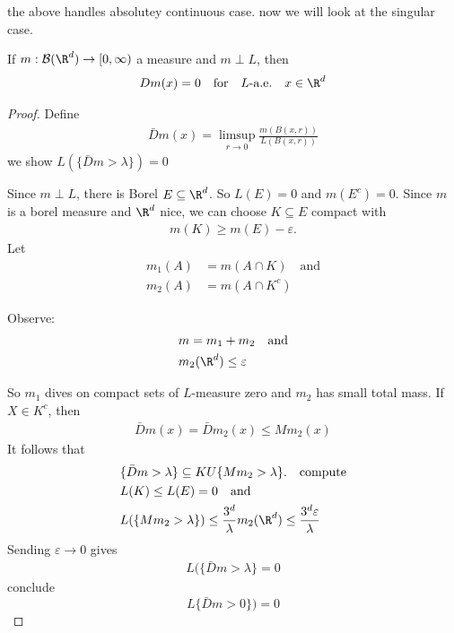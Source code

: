 \begin{remark}
	the above handles absolutey continuous case. now we will  look at the singular case.
\end{remark}


\begin{theorem}
	If $m : \mathcal{B}(\R^d) \to [0,\infty)$ a measure and $m \perp L$, then
	\begin{align*}
		D m(x) = 0 \quad \text{for} \quad L \text{-a.e.} \quad x \in \R^d
	\end{align*} 
\end{theorem}

\begin{proof}
	Define 
	\begin{align*}
		\bar{D} m(x) = \limsup_{r \to 0} \frac{m(B(x,r))}{L(B(x,r))}
	\end{align*} 
we show $L( \{ \bar{D}m > \lambda \}) = 0$

Since $m \perp L$, there is Borel $E \subseteq \R^d$. So $L(E) = 0$ and $m(E^c) = 0$.
Since  $m$ is a borel measure and $\R^d$ nice, we can choose $K \subseteq  E$ compact with
\begin{align*}
	m(K) \geq m(E) - \varepsilon.
\end{align*} 
Let
\begin{align*}
	m_1 (A) &= m(A \cap K) \quad \text{and} \\
	m_2 (A)	&= m( A \cap K^c)
\end{align*}

Observe: 
\begin{align*}
	&m = m_1 + m_2 \quad \text{and} \\
	&m_2(\R^d)\leq \varepsilon
\end{align*} 

So $m_1$ dives on compact sets of $L$-measure zero and $m_2$ has small total mass.
If $X \in K^c$, then 
\begin{align*}
	\bar{D}m(x) = \bar D m_2 (x) \leq M m_2 (x)
\end{align*} 
It follows that 
\begin{align*}
	&\{ \bar{D} m > \lambda \} \subseteq  K U \{ M m_2 > \lambda \}. \quad \text{compute} \\
	&L (K) \leq L(E) = 0 \quad \text{and} \\
	&L (\{ M m_2 > \lambda \}) \leq \frac{3^d}{\lambda} m_2 (\R^d) \leq \frac{3^d \varepsilon}{\lambda}
\end{align*} 
Sending $\varepsilon \to 0$ gives
\begin{align*}
	L ( \{ \bar{D} m > \lambda \} = 0
\end{align*} 
conclude
\[
	L\{ \bar{D} m > 0 \}) = 0
\]
\end{proof}


